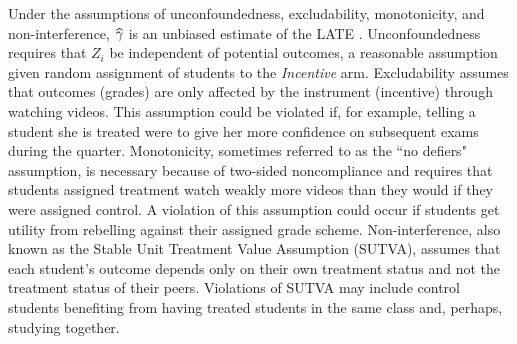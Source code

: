 \documentclass[12pt]{article}
\newcommand\wh[1]{\hstretch{2}{\hat{\hstretch{.5}{#1}}}}
\begin{document}
Under the assumptions of unconfoundedness, excludability, monotonicity, and non-interference, $\wh{\gamma}$ is an unbiased estimate of the LATE \parencite{ai1995}. Unconfoundedness requires that $Z_i$ be independent of potential outcomes, a reasonable assumption given random assignment of students to the \textit{Incentive} arm. Excludability assumes that outcomes (grades) are only affected by the instrument (incentive) through watching videos. This assumption could be violated if, for example, telling a student she is treated were to give her more confidence on subsequent exams during the quarter. Monotonicity, sometimes referred to as the ``no defiers" assumption, is necessary because of two-sided noncompliance and requires that students assigned treatment watch weakly more videos than they would if they were assigned control. A violation of this assumption could occur if students get utility from rebelling against their assigned grade scheme. Non-interference, also known as the Stable Unit Treatment Value Assumption (SUTVA), assumes that each student's outcome depends only on their own treatment status and not the treatment status of their peers. Violations of SUTVA may include control students benefiting from having treated students in the same class and, perhaps, studying together.
\end{document}
